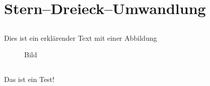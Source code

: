 %
%
%
%
\chapter{Stern--Dreieck--Umwandlung}\label{ex:einsinnvolleslabel}
%
%
\section{}\label{sec:einsinnvolleslabel}
%
Dies ist ein erklärender Text mit einer Abbildung

\begin{figure}[htb]
%

\caption{Bild}
%
\end{figure}

%
%
%
\section{}\label{sec:einsinnvolleslabel1}
%
Das ist ein Test!
%
\clearpage
